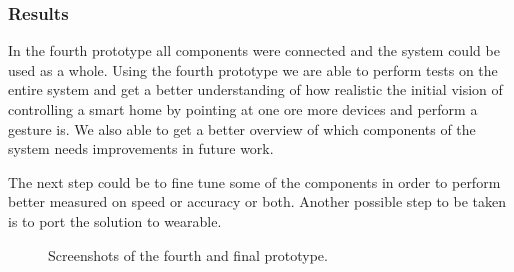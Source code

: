 \subsubsection{Results}

In the fourth prototype all components were connected and the system could be used as a whole. Using the fourth prototype we are able to perform tests on the entire system and get a better understanding of how realistic the initial vision of controlling a smart home by pointing at one ore more devices and perform a gesture is. We also able to get a better overview of which components of the system needs improvements in future work.

The next step could be to fine tune some of the components in order to perform better measured on speed or accuracy or both. Another possible step to be taken is to port the solution to wearable.

\begin{figure}[!htb]%
    \centering
    \caption{Screenshots of the fourth and final prototype.}
    \label{fig:prototype4-app-screenshots}
\end{figure}

